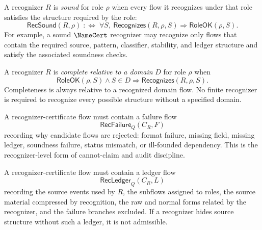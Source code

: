 \begin{definition}
\label{def:recognizer-generated-soundness}
A recognizer $R$ is \emph{sound} for role $\rho$ when every flow it recognizes under that role satisfies the structure required by the role:
$$
  \mathsf{RecSound}(R,\rho)
  \;:\Longleftrightarrow\;
  \forall S,\ \mathsf{Recognizes}(R,\rho,S)\Rightarrow\mathsf{RoleOK}(\rho,S).
$$
For example, a sound $\NameCert$ recognizer may recognize only flows that contain the required source, pattern, classifier, stability, and ledger structure and satisfy the associated soundness checks.
\end{definition}

\begin{definition}
\label{def:recognizer-generated-completeness}
A recognizer $R$ is \emph{complete relative to a domain} $D$ for role $\rho$ when
$$
  \mathsf{RoleOK}(\rho,S)\wedge S\in D
  \Longrightarrow
  \mathsf{Recognizes}(R,\rho,S).
$$
Completeness is always relative to a recognized domain flow. No finite recognizer is required to recognize every possible structure without a specified domain.
\end{definition}

\begin{definition}
\label{def:recognizer-generated-failure-ledger}
A recognizer-certificate flow must contain a failure flow
$$
  \mathsf{RecFailure}_Q(C_R,F)
$$
recording why candidate flows are rejected: format failure, missing field, missing ledger, soundness failure, status mismatch, or ill-founded dependency. This is the recognizer-level form of cannot-claim and audit discipline.
\end{definition}

\begin{definition}
\label{def:recognizer-generated-ledger}
A recognizer-certificate flow must contain a ledger flow
$$
  \mathsf{RecLedger}_Q(C_R,L)
$$
recording the source events used by $R$, the subflows assigned to roles, the source material compressed by recognition, the raw and normal forms related by the recognizer, and the failure branches excluded. If a recognizer hides source structure without such a ledger, it is not admissible.
\end{definition}

